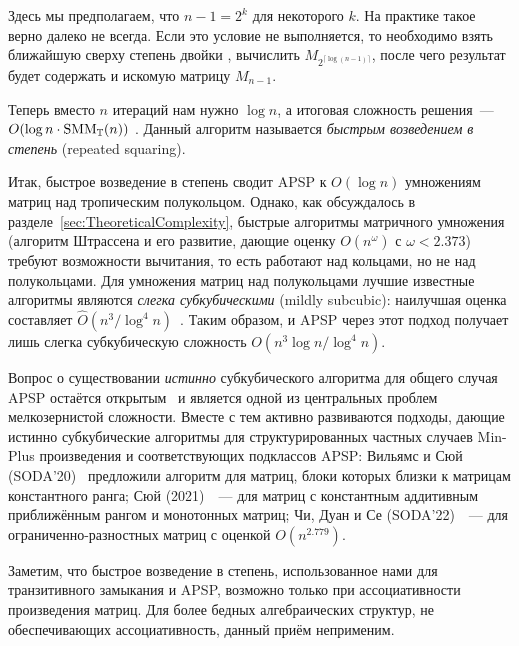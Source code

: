  Здесь мы предполагаем, что $n-1 = 2^k$ для некоторого $k$.
 На практике такое верно далеко не всегда.
 Если это условие не выполняется, то необходимо взять ближайшую сверху степень двойки%
 , вычислить $M_{2^{\lceil \log(n-1) \rceil}}$, после чего результат будет содержать и искомую матрицу $M_{n-1}$.

 Теперь вместо $n$ итераций нам нужно $\log{n}$, а итоговая сложность решения~--- $O(\log{n} \cdot \operatorname{SMM}_{\mathbb{T}}(n))$%
 .
 Данный алгоритм%
 называется \emph{быстрым возведением в степень} (repeated squaring).

 Итак, быстрое возведение в степень сводит APSP к $O(\log n)$ умножениям матриц над тропическим полукольцом.
 Однако, как обсуждалось в разделе~\ref{sec:TheoreticalComplexity}, быстрые алгоритмы матричного умножения (алгоритм Штрассена и его развитие, дающие оценку $O(n^\omega)$ с $\omega < 2.373$) требуют возможности вычитания, то есть работают над кольцами, но не над полукольцами.
 Для умножения матриц над полукольцами лучшие известные алгоритмы являются \emph{слегка субкубическими} (mildly subcubic): наилучшая оценка составляет $\hat{O}(n^3 / \log^4 n)$~.
 Таким образом, и APSP через этот подход получает лишь слегка субкубическую сложность $O(n^3 \log n / \log^4 n)$.

 Вопрос о существовании \emph{истинно} субкубического алгоритма для общего случая APSP остаётся открытым~ и является одной из центральных проблем мелкозернистой сложности.
 Вместе с тем активно развиваются подходы, дающие истинно субкубические алгоритмы для структурированных частных случаев Min-Plus произведения и соответствующих подклассов APSP: Вильямс и Сюй (SODA'20)~ предложили алгоритм для матриц, блоки которых близки к матрицам константного ранга; Сюй (2021)~~--- для матриц с константным аддитивным приближённым рангом и монотонных матриц; Чи, Дуан и Се (SODA'22)~~--- для ограниченно-разностных матриц с оценкой $O(n^{2.779})$.

 Заметим, что быстрое возведение в степень, использованное нами для транзитивного замыкания и APSP, возможно только при ассоциативности произведения матриц.
 Для более бедных алгебраических структур, не обеспечивающих ассоциативность, данный приём неприменим.

